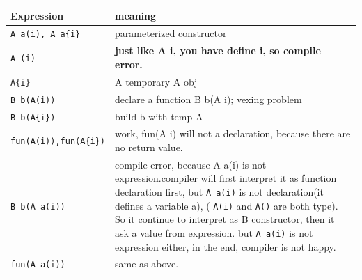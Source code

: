 \documentclass[a4paper,11pt,twoside]{book}
\newcommand{\tophline}{\hline }
\newcommand{\bottomhline}{\\ \hline }
\newcommand{\tophline}{ }
\newcommand{\bottomhline}{ }
\begin{document}
\begin{itemize}
	\begin{tabular}{|p{}|p{}|}
		\tophline
		Expression & meaning \\
		\tophline
		\texttt{A a(i), A a\{i\}} & parameterized constructor\\
		\tophline
		\texttt{A (i)} & \textbf{just like A i, you have define i, so compile error.} \\
		\tophline
		\texttt{A\{i\}} & A temporary A obj\\
		\tophline
		\texttt{B b(A(i))} & declare a function B b(A i); vexing problem \\
		\tophline
		\texttt{B b(A\{i\})} & build b with temp A\\
		\tophline
		\texttt{fun(A(i)),fun(A\{i\})} & work, fun(A i) will not a declaration, because there are no return value.\\
		\tophline
		\texttt{B b(A a(i))}  & compile error, because A a(i) is not expression.compiler will first interpret it as function declaration first, but \texttt{A a(i)} is not declaration(it defines a variable a), ( \texttt{A(i)} and \texttt{A()} are both type). So it continue to interpret as B constructor, then it ask a value from expression. but \texttt{A a(i)} is not expression either, in the end, compiler is not happy.  \\
		\tophline
		\texttt{fun(A a(i))} & same as above.
		\bottomhline
	\end{tabular}
	
%		
%		
			
\end{itemize}
\end{document}
